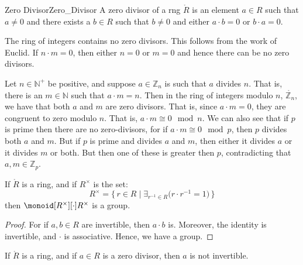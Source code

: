     \begin{fdefinition}{Zero Divisor}{Zero_Divisor}
        A zero divisor of a rng $\ring{R}$ is an element $a\in{R}$ such that
        $a\ne{0}$ and there exists a $b\in{R}$ such that $b\ne{0}$ and
        either $a\cdot{b}=0$ or $b\cdot{a}=0$.
    \end{fdefinition}
    \begin{example}
        The ring of integers contains no zero divisors. This follows from
        the work of Euclid. If $n\cdot{m}=0$, then either $n=0$ or $m=0$ and
        hence there can be no zero divisors.
    \end{example}
    \begin{example}
        Let $n\in\mathbb{N}^{+}$ be positive, and suppose
        $a\in\mathbb{Z}_{n}$ is such that $a$ divides $n$. That is, there is
        an $m\in\mathbb{N}$ such that $a\cdot{m}=n$. Then in the ring of
        integers modulo $n$, $\ring{\mathbb{Z}_{n}}$, we have that both
        $a$ and $m$ are zero divisors. That is, since $a\cdot{m}=0$, they
        are congruent to zero modulo $n$. That is,
        $a\cdot{m}\cong{0}\mod{n}$. We can also see that if $p$ is prime
        then there are no zero-divisors, for if $a\cdot{m}\cong{0}\mod{p}$,
        then $p$ divides both $a$ and $m$. But if $p$ is prime and divides
        $a$ and $m$, then either it divides $a$ or it divides $m$ or both.
        But then one of these is greater then $p$, contradicting that
        $a,m\in\mathbb{Z}_{p}$.
    \end{example}
    \begin{theorem}
        \label{thm:Group_of_Units_of_Ring_is_Group}%
        If $\ring{R}$ is a ring, and if $R^{\times}$ is the set:
        \begin{equation}
            R^{\times}=\big\{\,r\in{R}\;|\;
                \exists_{r^{\minus{1}}\in{R}}
                \big(r\cdot{r}^{\minus{1}}=1\big)\,\big\}
        \end{equation}
        then $\monoid[R^{\times}][\cdot]{R^{\times}}$ is a group.
    \end{theorem}
    \begin{proof}
        For if $a,b\in{R}$ are invertible, then $a\cdot{b}$ is. Moreover,
        the identity is invertible, and $\cdot$ is associative. Hence, we
        have a group.
    \end{proof}
    \begin{theorem}
        \label{thm:Ring_Zero_Divisor_Not_Invertible}%
        If $\ring{R}$ is a ring, and if $a\in{R}$ is a zero divisor, then
        $a$ is not invertible.
    \end{theorem}
